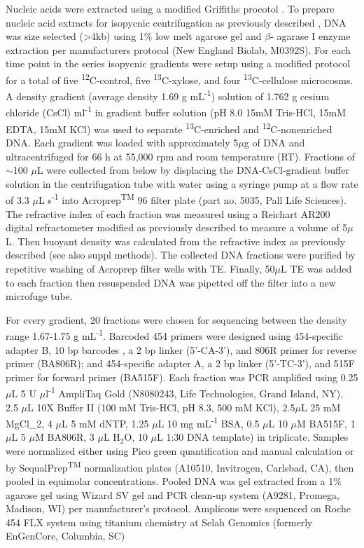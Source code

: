 Nucleic acids were extracted using a modified Griffiths procotol \cite{Griffiths_2000}. To prepare nucleic acid extracts for isopycnic centrifugation as previously described \cite{Buckley_2007}, DNA was size selected (\textgreater4kb) using 1\% low melt agarose gel and $\beta$- agarase I enzyme extraction per manufacturers protocol (New England Biolab, M0392S). For each time point in the series isopycnic gradients were setup using a modified protocol \cite{Neufeld_2007} for a total of five \textsuperscript{12}C-control, five \textsuperscript{13}C-xylose, and four \textsuperscript{13}C-cellulose microcosms. A density gradient (average density 1.69 g mL\textsuperscript{-1}) solution of 1.762 g cesium chloride (CsCl) ml\textsuperscript{-1} in gradient buffer solution (pH 8.0 15mM Tris-HCl, 15mM EDTA, 15mM KCl) was used to separate \textsuperscript{13}C-enriched and \textsuperscript{12}C-nonenriched DNA. Each gradient was loaded with approximately 5$\mu$g of DNA and ultracentrifuged for 66 h at 55,000 rpm and room temperature (RT). Fractions of $\sim$100 $\mu$L were collected from below by displacing the DNA-CsCl-gradient buffer solution in the centrifugation tube with water using a syringe pump at a flow rate of 3.3 $\mu$L s\textsuperscript{-1} \cite{Manefield_2002} into Acroprep\textsuperscript{TM} 96 filter plate (part no. 5035, Pall Life Sciences). The refractive index of each fraction was measured using a Reichart AR200 digital refractometer modified as previously described \cite{Buckley_2007} to measure a volume of 5$\mu$L. Then buoyant density was calculated from the refractive index as previously described \cite{Buckley_2007} (see also suppl methods). The collected DNA fractions were purified by repetitive washing of Acroprep filter wells with TE. Finally, 50$\mu$L TE was added to each fraction then resuspended DNA was pipetted off the filter into a new microfuge tube. 


For every gradient, 20 fractions were chosen for sequencing between the density range 1.67-1.75 g mL\textsuperscript{-1}. Barcoded 454 primers were designed using 454-specific adapter B, 10 bp barcodes \cite{Hamady_2008}, a 2 bp linker (5'-CA-3'), and 806R primer for reverse primer (BA806R); and 454-specific adapter A, a 2 bp linker  (5'-TC-3'), and 515F primer for forward primer (BA515F). Each fraction was PCR amplified using 0.25 $\mu$L 5 U $\mu$l\textsuperscript{-1} AmpliTaq Gold (N8080243, Life Technologies, Grand Island, NY), 2.5 $\mu$L 10X Buffer II (100 mM Tris-HCl, pH 8.3, 500 mM KCl), 2.5$\mu$L 25 mM MgCl_{2}, 4 $\mu$L 5 mM dNTP, 1.25 $\mu$L 10 mg mL\textsuperscript{-1} BSA, 0.5 $\mu$L 10 $\mu$M BA515F, 1 $\mu$L 5 $\mu$M BA806R, 3 $\mu$L H$_{2}$O, 10 $\mu$L 1:30 DNA template) in triplicate. Samples were normalized either using Pico green quantification and manual calculation or by SequalPrep\textsuperscript{TM} normalization plates (A10510, Invitrogen, Carlsbad, CA), then pooled in equimolar concentrations.  Pooled DNA was gel extracted from a 1\% agarose gel using Wizard SV gel and PCR clean-up system (A9281, Promega, Madison, WI) per manufacturer's protocol.  Amplicons were sequenced on Roche 454 FLX system using titanium chemistry at Selah Genomics (formerly EnGenCore, Columbia, SC)  
